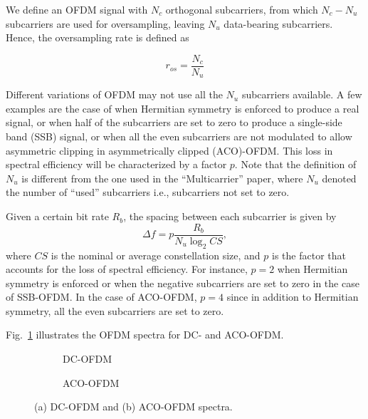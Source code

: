 \documentclass[a4paper]{article}
\begin{document}
We define an OFDM signal with $N_c$ orthogonal subcarriers, from which $N_c - N_u$ subcarriers are used for oversampling, leaving $N_u$ data-bearing subcarriers. Hence, the oversampling rate is defined as

\begin{equation}
r_{os} = \frac{N_c}{N_u}
\end{equation}

Different variations of OFDM may not use all the $N_u$ subcarriers available. A few examples are the case of when Hermitian symmetry is enforced to produce a real signal, or when half of the subcarriers are set to zero to produce a single-side band (SSB) signal, or when all the even subcarriers are not modulated to allow asymmetric clipping in asymmetrically clipped (ACO)-OFDM. This loss in spectral efficiency will be characterized by a factor $p$. Note that the definition of $N_u$ is different from the one used in the ``Multicarrier'' paper, where $N_u$ denoted the number of ``used'' subcarriers i.e., subcarriers not set to zero. 

Given a certain bit rate $R_b$, the spacing between each subcarrier is given by
\begin{equation} \label{eq:ofdm-subcarrier-spacing}
\Delta f = p\frac{R_b}{N_u\log_2 CS},
\end{equation}
where $CS$ is the nominal or average constellation size, and $p$ is the factor that accounts for the loss of spectral efficiency. For instance, $p = 2$ when Hermitian symmetry is enforced or when the negative subcarriers are set to zero in the case of SSB-OFDM. In the case of ACO-OFDM, $p = 4$ since in addition to Hermitian symmetry, all the even subcarriers are set to zero. 

Fig.~\ref{fig:ofdm-spectra} illustrates the OFDM spectra for DC- and ACO-OFDM.

\FloatBarrier
\begin{figure}[h!]
	\centering
	\begin{subfigure}[h!]{\textwidth}
		\centering
		\resizebox{\linewidth}{!}{}
		\caption{DC-OFDM}
	\end{subfigure}%
	
	\begin{subfigure}[h!]{\textwidth}
		\centering
		\resizebox{\linewidth}{!}{}
		\caption{ACO-OFDM}
	\end{subfigure}
	\caption{(a) DC-OFDM and (b) ACO-OFDM spectra.} \label{fig:ofdm-spectra}
\end{figure}
\FloatBarrier
\end{document}
